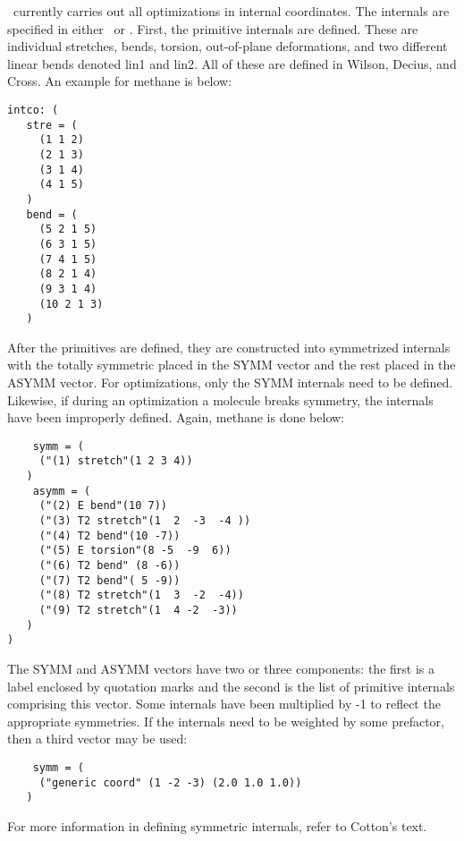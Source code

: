 \PSIthree\ currently carries out all optimizations in
internal coordinates. The internals are specified in either
\ or \intcodat. First, the primitive internals
are defined. These are individual
stretches, bends, torsion, out-of-plane deformations,
and two different linear bends denoted lin1 and lin2.
All of these are defined in Wilson, Decius, and Cross. An example for methane is
below:
\begin{verbatim}
intco: (
   stre = (
     (1 1 2)
     (2 1 3)
     (3 1 4)
     (4 1 5)
   )
   bend = (
     (5 2 1 5)
     (6 3 1 5)
     (7 4 1 5)
     (8 2 1 4)
     (9 3 1 4)
     (10 2 1 3)
   )
\end{verbatim}
After the primitives are defined, they are constructed into
symmetrized internals with the totally symmetric placed in
the SYMM vector and the rest placed in the ASYMM vector. For
optimizations, only the SYMM internals need to be defined.
Likewise, if during an optimization a molecule breaks symmetry,
the internals have been improperly defined. Again, methane is done
below:
\begin{verbatim}
    symm = (
     ("(1) stretch"(1 2 3 4))
   )
    asymm = (
     ("(2) E bend"(10 7))
     ("(3) T2 stretch"(1  2  -3  -4 ))
     ("(4) T2 bend"(10 -7))
     ("(5) E torsion"(8 -5  -9  6))
     ("(6) T2 bend" (8 -6))
     ("(7) T2 bend"( 5 -9))
     ("(8) T2 stretch"(1  3  -2  -4))
     ("(9) T2 stretch"(1  4 -2  -3))
   )
)
\end{verbatim}
The SYMM and ASYMM vectors have two or three components: the first
is a label enclosed by quotation marks and the second is the list
of primitive internals comprising this vector. Some
internals have been multiplied by -1 to reflect the appropriate
symmetries. If the internals need to be weighted by some prefactor,
then a third vector may be used: 
\begin{verbatim}
    symm = (
     ("generic coord" (1 -2 -3) (2.0 1.0 1.0))
   )
\end{verbatim}
For more information in defining symmetric internals, refer to Cotton's text.

